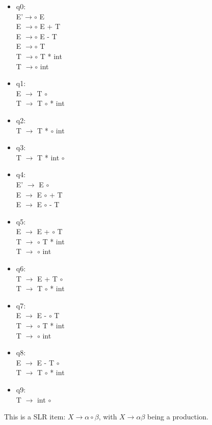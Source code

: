 \documentclass[12pt]{article}
\begin{document}
\begin{itemize}
    \item q0:
        \\ E'$\rightarrow \circ$ E 
        \\ E $\rightarrow \circ$ E + T
        \\ E $\rightarrow \circ$ E - T
        \\ E $\rightarrow \circ$ T
        \\ T $\rightarrow \circ$ T * int 
        \\ T $\rightarrow \circ$ int
    \item q1:
        \\ E $\rightarrow$ T $\circ$ 
        \\ T $\rightarrow$ T $\circ$ * int
    \item q2:
        \\ T $\rightarrow$ T * $\circ$ int
    \item q3:
        \\ T $\rightarrow$ T * int $\circ$
    \item q4:
        \\ E' $\rightarrow$ E $\circ$ 
        \\ E $\rightarrow$ E $\circ$ + T
        \\ E $\rightarrow$ E $\circ$ - T
    \item q5:
        \\ E $\rightarrow$ E + $\circ$ T
        \\ T $\rightarrow$ $\circ$ T * int
        \\ T $\rightarrow$ $\circ$ int
    \item q6:
        \\ T $\rightarrow$ E + T $\circ$
        \\ T $\rightarrow$ T $\circ$ * int
    \item q7:
        \\ E $\rightarrow$ E - $\circ$ T
        \\ T $\rightarrow$ $\circ$ T * int
        \\ T $\rightarrow$ $\circ$ int
    \item q8:
        \\ E $\rightarrow$ E - T $\circ$
        \\ T $\rightarrow$ T $\circ$ * int
    \item q9:
        \\ T $\rightarrow$ int $\circ$
\end{itemize}
This is a SLR item: $X \rightarrow \alpha \circ \beta$, with $X \rightarrow \alpha \beta$ being a production. 
\end{document}
